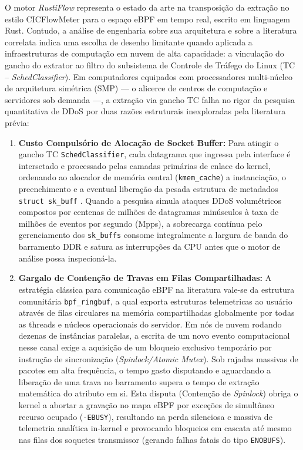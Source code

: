 \documentclass[conference]{IEEEtran}
\begin{document}
O motor \textit{RustiFlow} representa o estado da arte na transposição da extração no estilo CICFlowMeter para o espaço eBPF em tempo real, escrito em linguagem Rust. Contudo, a análise de engenharia sobre sua arquitetura e sobre a literatura correlata indica uma escolha de desenho limitante quando aplicada a infraestruturas de computação em nuvem de alta capacidade: a vinculação do gancho do extrator ao filtro do subsistema de Controle de Tráfego do Linux (TC -- \textit{SchedClassifier}). Em computadores equipados com processadores multi-núcleo de arquitetura simétrica (SMP) — o alicerce de centros de computação e servidores sob demanda —, a extração via gancho TC falha no rigor da pesquisa quantitativa de DDoS por duas razões estruturais inexploradas pela literatura prévia:
\begin{enumerate}
    \item \textbf{Custo Compulsório de Alocação de Socket Buffer:} Para atingir o gancho TC \texttt{SchedClassifier}, cada datagrama que ingressa pela interface é intersetado e processado pelas camadas primárias de enlace do kernel, ordenando ao alocador de memória central (\texttt{kmem\_cache}) a instanciação, o preenchimento e a eventual liberação da pesada estrutura de metadados \texttt{struct sk\_buff} \cite{ref_2018_the}. Quando a pesquisa simula ataques DDoS volumétricos compostos por centenas de milhões de datagramas minúsculos à taxa de milhões de eventos por segundo (Mpps), a sobrecarga contínua pelo gerenciamento dos \texttt{sk\_buffs} consome integralmente a largura de banda do barramento DDR e satura as interrupções da CPU antes que o motor de análise possa inspecioná-la.
    \item \textbf{Gargalo de Contenção de Travas em Filas Compartilhadas:} A estratégia clássica para comunicação eBPF na literatura vale-se da estrutura comunitária \texttt{bpf\_ringbuf}, a qual exporta estruturas telemetricas ao usuário através de filas circulares na memória compartilhadas globalmente por todas as threads e núcleos operacionais do servidor. Em nós de nuvem rodando dezenas de instâncias paralelas, a escrita de um novo evento computacional nesse canal exige a aquisição de um bloqueio exclusivo temporário por instrução de sincronização (\textit{Spinlock/Atomic Mutex}). Sob rajadas massivas de pacotes em alta frequência, o tempo gasto disputando e aguardando a liberação de uma trava no barramento supera o tempo de extração matemática do atributo em si. Esta disputa (Contenção de \textit{Spinlock}) obriga o kernel a abortar a gravação no mapa eBPF por exceções de simultâneo recurso ocupado (\texttt{-EBUSY}), resultando na perda silenciosa e massiva de telemetria analítica in-kernel e provocando bloqueios em cascata até mesmo nas filas dos soquetes transmissor (gerando falhas fatais do tipo \texttt{ENOBUFS}).
\end{enumerate}
\end{document}
